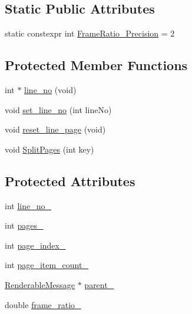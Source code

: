 \subsection*{Static Public Attributes}
\begin{DoxyCompactItemize}
\item 
static constexpr int \hyperlink{classRenderableMessage_af8a50adc6f5e10a890eb435390e4e8a6}{Frame\-Ratio\-\_\-\-Precision} = 2
\end{DoxyCompactItemize}
\subsection*{Protected Member Functions}
\begin{DoxyCompactItemize}
\item 
int $\ast$ \hyperlink{classRenderableMessage_a88b81ff1a8da326284fb4732b3d33f46}{line\-\_\-no} (void)
\item 
void \hyperlink{classRenderableMessage_aa6685f59c0d7a11b7510aa0f822d1a03}{set\-\_\-line\-\_\-no} (int line\-No)
\item 
void \hyperlink{classRenderableMessage_af2cbc010cd97044dee4ebb42c46ff340}{reset\-\_\-line\-\_\-page} (void)
\item 
void \hyperlink{classRenderableMessage_a6ca2c5740e208cb4062fbe021ce72853}{Split\-Pages} (int key)
\end{DoxyCompactItemize}
\subsection*{Protected Attributes}
\begin{DoxyCompactItemize}
\item 
int \hyperlink{classRenderableMessage_ae3a742ebe02b5a7f547e97921464e8b5}{line\-\_\-no\-\_\-}
\item 
int \hyperlink{classRenderableMessage_ac3a01804a7e180672c2a34fe2b8b0a8c}{pages\-\_\-}
\item 
int \hyperlink{classRenderableMessage_a1d6dcb391ac3d77b8b38c5e926d58375}{page\-\_\-index\-\_\-}
\item 
int \hyperlink{classRenderableMessage_ac013cc75fdc393be5bf3c8e95d1b5430}{page\-\_\-item\-\_\-count\-\_\-}
\item 
\hyperlink{classRenderableMessage}{Renderable\-Message} $\ast$ \hyperlink{classRenderableMessage_a4745527c9b4cf149bfeccee669fd3aa8}{parent\-\_\-}
\item 
double \hyperlink{classRenderableMessage_a41d8fd1e6b5f8dee768ee227783c6913}{frame\-\_\-ratio\-\_\-}
\end{DoxyCompactItemize}
